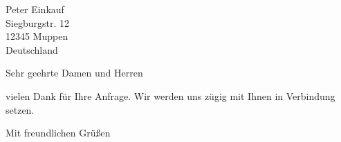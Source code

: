 \documentclass[pogletter,fontsize=11pt]{scrlttr2}
\begin{document}


\begin{letter}{%
	Peter Einkauf \\
	Siegburgstr. 12 \\
	12345 Muppen \\
	Deutschland \\
	\vspace{1.2cm}
}
\opening{Sehr geehrte Damen und Herren}

vielen Dank für Ihre Anfrage. Wir werden uns zügig mit Ihnen in Verbindung setzen.


\closing{Mit freundlichen Grüßen}
\end{letter}
\end{document}
